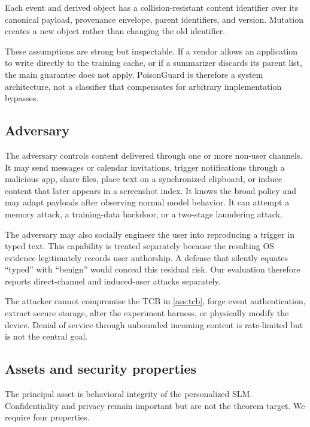 \begin{assumption}
\label{ass:identity}
Each event and derived object has a collision-resistant content identifier over its canonical payload, provenance envelope, parent identifiers, and version. Mutation creates a new object rather than changing the old identifier.
\end{assumption}

These assumptions are strong but inspectable. If a vendor allows an application to write directly to the training cache, or if a summarizer discards its parent list, the main guarantee does not apply. PoisonGuard is therefore a system architecture, not a classifier that compensates for arbitrary implementation bypasses.

\subsection{Adversary}

The adversary controls content delivered through one or more non-user channels. It may send messages or calendar invitations, trigger notifications through a malicious app, share files, place text on a synchronized clipboard, or induce content that later appears in a screenshot index. It knows the broad policy and may adapt payloads after observing normal model behavior. It can attempt a memory attack, a training-data backdoor, or a two-stage laundering attack.

The adversary may also socially engineer the user into reproducing a trigger in typed text. This capability is treated separately because the resulting OS evidence legitimately records user authorship. A defense that silently equates ``typed'' with ``benign'' would conceal this residual risk. Our evaluation therefore reports direct-channel and induced-user attacks separately.

The attacker cannot compromise the TCB in \cref{ass:tcb}, forge event authentication, extract secure storage, alter the experiment harness, or physically modify the device. Denial of service through unbounded incoming content is rate-limited but is not the central goal.

\subsection{Assets and security properties}

The principal asset is behavioral integrity of the personalized SLM. Confidentiality and privacy remain important but are not the theorem target. We require four properties.

